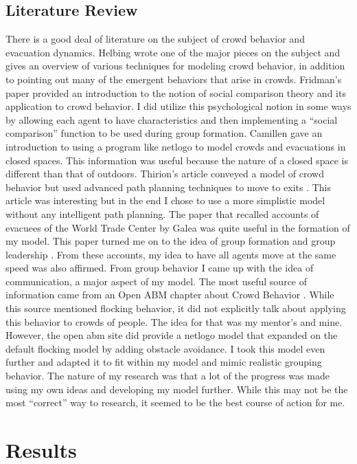 \documentclass{article}
\begin{document}
\subsection{Literature Review}
There is a good deal of literature on the subject of crowd behavior and evacuation dynamics. Helbing wrote one of the major pieces on the subject and gives an overview of various techniques for modeling crowd behavior, in addition to pointing out many of the emergent behaviors that arise in crowds. \cite{helbing} Fridman's paper provided an introduction to the notion of social comparison theory and its application to crowd behavior. \cite{fridman} I did utilize this psychological notion in some ways by allowing each agent to have characteristics and then implementing a ``social comparison'' function to be used during group formation. Camillen gave an introduction to using a program like netlogo to model crowds and evacuations in closed spaces. This information was useful because the nature of a closed space is different than that of outdoors. \cite{camillen} Thirion's article conveyed a model of crowd behavior but used advanced path planning techniques to move to exits \cite {thirion}. This article was interesting but in the end I chose to use a more simplistic model without any intelligent path planning. The paper that recalled accounts of evacuees of the World Trade Center by Galea was quite useful in the formation of my model. This paper turned me on to the idea of group formation and group leadership \cite{galea}. From these accounts, my idea to have all agents move at the same speed was also affirmed. From group behavior I came up with the idea of communication, a major aspect of my model. The most useful source of information came from an Open ABM chapter about Crowd Behavior \cite{openabm}. While this source mentioned flocking behavior, it did not explicitly talk about applying this behavior to crowds of people. The idea for that was my mentor's and mine. However, the open abm site did provide a netlogo model that expanded on the default flocking model by adding obstacle avoidance. I took this model even further and adapted it to fit within my model and mimic realistic grouping behavior. The nature of my research was that a lot of the progress was made using my own ideas and developing my model further. While this may not be the most ``correct'' way to research, it seemed to be the best course of action for me.



\section{Results}
\end{document}
